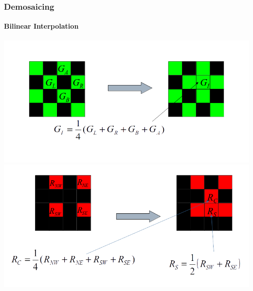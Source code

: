 \documentclass{beamer}
\begin{document}
\begin{frame}
\frametitle{Demosaicing}
\framesubtitle{Bilinear Interpolation}
\begin{center}
\includegraphics[scale=0.2]{images/L7_GreenBI2.png}\\
\includegraphics[scale=0.2]{images/L7_RedBI.png}
\end{center}
\end{frame}
\end{document}
